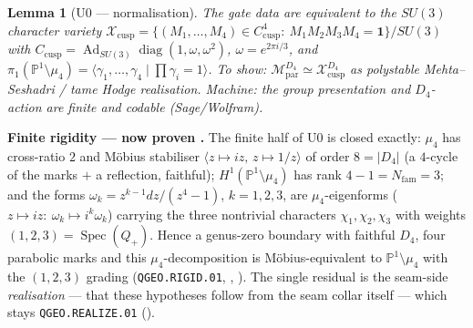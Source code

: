 \documentclass[11pt,a4paper]{article}
\newcommand{\Nfam}{N_{\mathrm{fam}}}
\newcommand{\PP}{\mathbb P^1}
\newtheorem{lemma}{Lemma}
\begin{document}
\begin{lemma}[U0 --- normalisation]
The gate data are equivalent to the $SU(3)$ character variety
$\mathcal X_{\mathrm{cusp}}=\{(M_1,\dots,M_4)\in C_{\mathrm{cusp}}^4:\ M_1M_2M_3M_4=\mathbf1\}/SU(3)$ with
$C_{\mathrm{cusp}}=\operatorname{Ad}_{SU(3)}\operatorname{diag}(1,\omega,\omega^2)$, $\omega=e^{2\pi i/3}$,
and $\pi_1(\PP\setminus\mu_4)=\langle\gamma_1,\dots,\gamma_4\mid\prod\gamma_i=1\rangle$. To show:
$\mathcal M_{\mathrm{par}}^{D_4}\simeq\mathcal X_{\mathrm{cusp}}^{D_4}$ as polystable Mehta--Seshadri / tame
Hodge realisation. \emph{Machine: the group presentation and $D_4$-action are finite and codable
(Sage/Wolfram).}
\end{lemma}

\noindent\textbf{Finite rigidity --- now proven \mE.} The finite half of U0 is closed exactly:
$\mu_4$ has cross-ratio $2$ and M\"obius stabiliser $\langle z\mapsto iz,\,z\mapsto1/z\rangle$ of
order $8=|D_4|$ (a $4$-cycle of the marks $+$ a reflection, faithful); $H^1(\PP\setminus\mu_4)$ has
rank $4-1=\Nfam=3$; and the forms $\omega_k=z^{k-1}dz/(z^4-1)$, $k=1,2,3$, are $\mu_4$-eigenforms
($z\mapsto iz:\ \omega_k\mapsto i^k\omega_k$) carrying the three nontrivial characters
$\chi_1,\chi_2,\chi_3$ with weights $(1,2,3)=\operatorname{Spec}(Q_+)$. Hence a genus-zero boundary
with faithful $D_4$, four parabolic marks and this $\mu_4$-decomposition is M\"obius-equivalent to
$\PP\setminus\mu_4$ with the $(1,2,3)$ grading (\texttt{QGEO.RIGID.01}, \mE,
). The single residual is the seam-side \emph{realisation} --- that
these hypotheses follow from the seam collar itself --- which stays \texttt{QGEO.REALIZE.01} (\mC).
\end{document}
